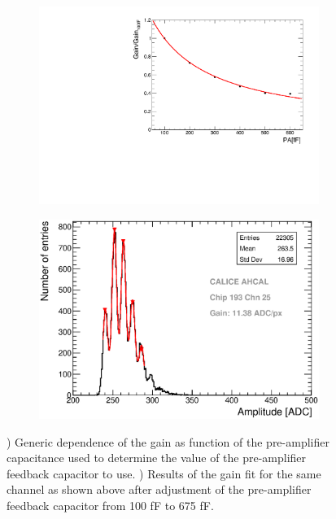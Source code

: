 \begin{figure}[htbp!]
  \centering
  \begin{subfigure}[t]{0.49\textwidth}
    \includegraphics[width=1.\linewidth]{../Thesis_Plots/Commissioning/Plots/GainvsPA.pdf}
    \caption{} \label{fig:PA_curve}
  \end{subfigure}
  \hfill
  \begin{subfigure}[t]{0.49\textwidth}
    \includegraphics[width=1.\linewidth]{../Thesis_Plots/Commissioning/Plots/Gain675fF_MainzHBU4.eps}
    \caption{} \label{fig:Gain675fF}
  \end{subfigure}
  \caption{) Generic dependence of the gain as function of the pre-amplifier capacitance used to determine the value of the pre-amplifier feedback capacitor to use. ) Results of the gain fit for the same channel as shown above after adjustment of the pre-amplifier feedback capacitor from 100 fF to 675 fF.}
\end{figure}

